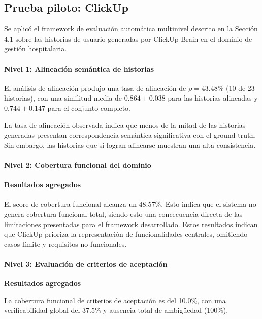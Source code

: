 \subsection{Prueba piloto: ClickUp}
Se aplicó el framework de evaluación automática multinivel descrito en la Sección 4.1 sobre las historias de usuario generadas por ClickUp Brain en el dominio de gestión hospitalaria. 

\paragraph{Nivel 1: Alineación semántica de historias}

El análisis de alineación produjo una tasa de alineación de $\rho = 43.48\%$ (10 de 23 historias), con una similitud media de $0.864 \pm 0.038$ para las historias alineadas y $0.744 \pm 0.147$ para el conjunto completo.

La tasa de alineación observada indica que menos de la mitad de las historias generadas presentan correspondencia semántica significativa con el ground truth. Sin embargo, las historias que sí logran alinearse muestran una alta consistencia.

\paragraph{Nivel 2: Cobertura funcional del dominio}

\paragraph{Resultados agregados}

El score de cobertura funcional alcanza un 48.57\%.
Esto indica que el sistema no genera cobertura funcional total, siendo esto una concecuencia directa de las limitaciones presentadas para el framework desarrollado.
Estos resultados indican que ClickUp prioriza la representación de funcionalidades centrales, omitiendo casos límite y requisitos no funcionales.

\paragraph{Nivel 3: Evaluación de criterios de aceptación}

\textbf{Resultados agregados}

La cobertura funcional de criterios de aceptación es del 10.0\%, con una verificabilidad global del 37.5\% y ausencia total de ambigüedad (100\%).

